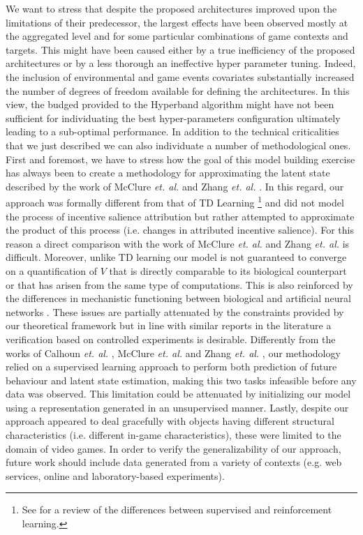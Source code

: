 We want to stress that despite the proposed architectures improved upon the limitations of their predecessor, the largest effects have been observed mostly at the aggregated level and for some particular combinations of game contexts and targets. This might have been caused either by a true inefficiency of the proposed architectures or by a less thorough an ineffective hyper parameter tuning. Indeed, the inclusion of environmental and game events covariates substantially increased the number of degrees of freedom available for defining the architectures. In this view, the budged provided to the Hyperband algorithm might have not been sufficient for individuating the best hyper-parameters configuration ultimately leading to a sub-optimal performance. In addition to the technical criticalities that we just described we can also individuate a number of methodological ones. First and foremost, we have to stress how the goal of this model building exercise has always been to create a methodology for approximating the latent state described by the work of McClure \textit{et. al.} \cite{mcclure2003computational} and Zhang \textit{et. al.} \cite{zhang2009neural}. In this regard, our approach was formally different from that of TD Learning \footnote{See \cite{barto2004reinforcement} for a  review of the differences between supervised and reinforcement learning.} and did not model the process of incentive salience attribution but rather attempted to approximate the product of this process (i.e. changes in attributed incentive salience). For this reason a direct comparison with the work of McClure \textit{et. al.} \cite{mcclure2003computational} and Zhang \textit{et. al.} \cite{zhang2009neural} is difficult. Moreover, unlike TD learning \cite{schultz1997neural} our model is not guaranteed to converge on a quantification of $V$ that is directly comparable to its biological counterpart or that has arisen from the same type of computations. This is also reinforced by the differences in mechanistic functioning between biological and artificial neural networks \cite{lillicrap2019backpropagation,lillicrap2020backpropagation}. These issues are partially attenuated by the constraints provided by our theoretical framework but in line with similar reports in the literature \cite{calhoun2019unsupervised,wang2018prefrontal} a verification based on controlled experiments is desirable. Differently from the works of Calhoun \textit{et. al.} \cite{calhoun2019unsupervised},  McClure \textit{et. al.} \cite{mcclure2003computational} and Zhang \textit{et. al.} \cite{zhang2009neural}, our methodology relied on a  supervised learning approach to perform both prediction of future behaviour and latent state estimation, making this two tasks infeasible before any data was observed. This limitation could be attenuated by initializing our model using a representation  generated in an unsupervised manner. Lastly, despite our approach appeared to deal gracefully  with objects having different structural characteristics (i.e. different in-game characteristics), these were limited to the domain of video games. In order to verify the generalizability of our approach, future work should include data generated from a variety of contexts (e.g. web services, online and laboratory-based experiments).

